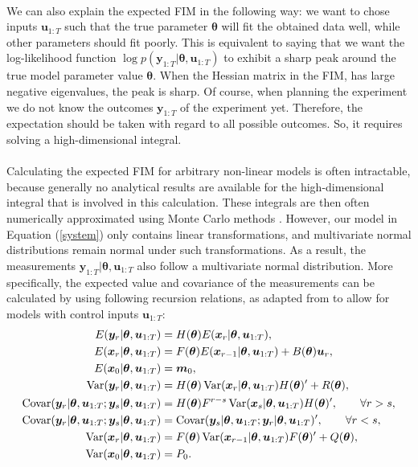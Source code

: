 \\
We can also explain the expected FIM in the following way: we want to chose inputs $\bm u_{1:T}$ such that the true parameter $\bm \theta$ will fit the obtained data well, while other parameters should fit poorly. This is equivalent to saying that we want the log-likelihood function $\log p(\bm y_{1:T}|\bm \theta, \bm u_{1:T})$ to exhibit a sharp peak around the true model parameter value $\bm \theta$. When the Hessian matrix in the FIM, has large negative eigenvalues, the peak is sharp. Of course, when planning the experiment we do not know the outcomes $\bm y_{1:T}$ of the experiment yet. Therefore, the expectation should be taken with regard to all possible outcomes. So, it requires solving a high-dimensional integral.  
\\
\\
Calculating the expected FIM for arbitrary non-linear models is often intractable, because generally no analytical results are available for the high-dimensional integral that is involved in this calculation. {\color{red}These integrals are then often numerically approximated using Monte Carlo methods \parencite{ryan}.} However, our model in Equation (\ref{system}) only contains linear transformations, and multivariate normal distributions remain normal under such transformations. As a result, the measurements $\bm y_{1:T}|\bm \theta, \bm u_{1:T}$ also follow a multivariate normal distribution. More specifically, the expected value and covariance of the measurements can be calculated by using following recursion relations, as adapted from \textcite{cavanaugh} to allow for models with control inputs $\bm u_{1:T}$:
\begin{equation}
\begin{aligned}
E(\bm y_r |\bm \theta, \bm u_{1:T})
&= H(\bm \theta)E(\bm x_r |\bm \theta, \bm u_{1:T}),\\
E(\bm x_r |\bm \theta, \bm u_{1:T})
&= F(\bm \theta)E(\bm x_{r-1} |\bm \theta, \bm u_{1:T}) + B(\bm \theta)\bm u_r,\\
E(\bm x_0|\bm \theta, \bm u_{1:T})
&= \bm m_0, \\
\operatorname{\mathrm{Var}} (\bm y_r |\bm \theta, \bm u_{1:T})
&= H(\bm \theta)\operatorname{\mathrm{Var}} (\bm x_r |\bm \theta, \bm u_{1:T})H(\bm \theta)' + R(\bm \theta),\\
\operatorname{\mathrm{Covar}} (\bm y_r |\bm \theta, \bm u_{1:T};\bm y_s |\bm \theta, \bm u_{1:T})
&= H(\bm \theta)F^{r-s}\operatorname{\mathrm{Var}} (\bm x_s |\bm \theta, \bm u_{1:T})H(\bm \theta)',
\qquad \forall r>s,\\
\operatorname{\mathrm{Covar}} (\bm y_r |\bm \theta, \bm u_{1:T};\bm y_s |\bm \theta, \bm u_{1:T})
&=\operatorname{\mathrm{Covar}} (\bm y_s |\bm \theta, \bm u_{1:T};\bm y_r |\bm \theta, \bm u_{1:T})', 
\qquad \forall r<s,\\
\operatorname{\mathrm{Var}} (\bm x_r |\bm \theta, \bm u_{1:T})
&= F(\bm \theta)\operatorname{\mathrm{Var}} (\bm x_{r-1} |\bm \theta, \bm u_{1:T})F(\bm \theta)' + Q(\bm \theta),\\
\operatorname{\mathrm{Var}} (\bm x_0 |\bm \theta, \bm u_{1:T})
&= P_0.
\label{recursion0}
\end{aligned}
\end{equation}
